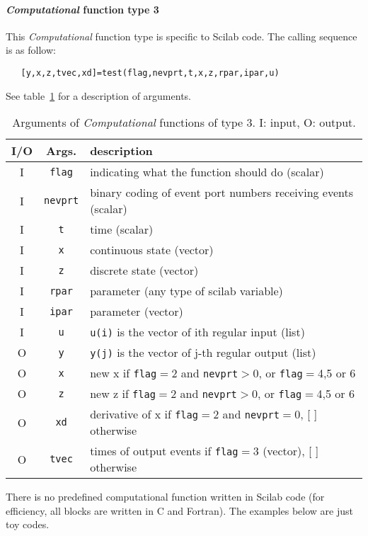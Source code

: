 \documentclass{book}
\newcommand{\computational}{{\em Computational }}
\begin{document}
\paragraph{\computational function type 3}
This \computational function type is specific to Scilab code. The calling
sequence is as follow:
\begin{verbatim}
   [y,x,z,tvec,xd]=test(flag,nevprt,t,x,z,rpar,ipar,u)
\end{verbatim}
See table~\ref{tab30} for a description of arguments.
\begin{table}[ht]
\begin{center}
\begin{tabular}{|c|c|l|} \hline
I/O&Args.&description \\ \hline
I &  {\tt flag} & indicating what the function should do (scalar) \\
I &  {\tt nevprt} & binary coding of event port numbers 
receiving events (scalar) \\
I &  {\tt t} & time (scalar)\\
I &  {\tt x} & continuous state (vector)\\
I &  {\tt z} & discrete state (vector)\\
I &  {\tt rpar}  &parameter (any type of scilab variable)\\
I &  {\tt ipar} & parameter (vector)\\
I &  {\tt u} & {\tt u(i)} is the vector of ith regular input (list) \\
O &  {\tt y}& {\tt y(j)} is the vector of j-th regular output (list)\\
O &  {\tt x} & new x if {\tt flag}$=$2 
and {\tt nevprt}$>0$, or {\tt flag}$=$4,5 or 6 \\
O &  {\tt z} & new z if {\tt flag}$=$2
and {\tt nevprt}$>0$, or {\tt flag}$=$4,5 or 6 \\
O &  {\tt xd} & derivative of x if {\tt flag}$=$2 and {\tt nevprt}$=0$, [ ] otherwise\\
O &  {\tt tvec} & times of output events if {\tt flag}$=$3 (vector), [ ] otherwise \\ \hline
\end{tabular}
\caption{Arguments of \computational functions of type 3. I: input, O: output.}
\label{tab30}
\end{center}
\end{table}
 

\bigskip

There is no predefined computational function written in Scilab code
(for efficiency, all blocks are written in C and Fortran). The
examples below are just toy codes.
\end{document}

